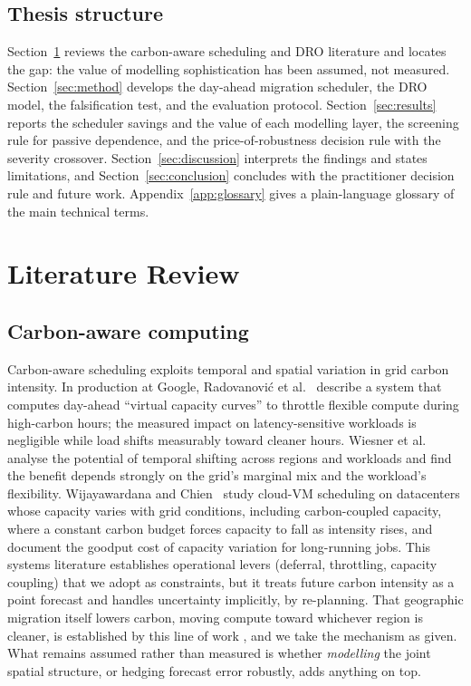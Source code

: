 \documentclass[12pt]{article}
\begin{document}
\subsection{Thesis structure}
Section~\ref{sec:lit} reviews the carbon-aware scheduling and DRO literature and
locates the gap: the value of modelling sophistication has been assumed, not
measured. Section~\ref{sec:method} develops the day-ahead migration scheduler, the
DRO model, the falsification test, and the evaluation protocol.
Section~\ref{sec:results} reports the scheduler savings and the value of each
modelling layer, the screening rule for passive dependence, and the
price-of-robustness decision rule with the severity crossover.
Section~\ref{sec:discussion} interprets the findings and states limitations, and
Section~\ref{sec:conclusion} concludes with the practitioner decision rule and future
work. Appendix~\ref{app:glossary} gives a plain-language glossary of the main
technical terms.

\section{Literature Review}\label{sec:lit}

\subsection{Carbon-aware computing}
Carbon-aware scheduling exploits temporal and spatial variation in grid carbon
intensity. In production at Google, Radovanovi\'c et
al.~\citep{radovanovic2023} describe a system that
computes day-ahead ``virtual capacity curves'' to throttle flexible compute during
high-carbon hours; the measured impact on latency-sensitive workloads is negligible
while load shifts measurably toward cleaner hours. Wiesner et al.~\citep{wiesner2021} analyse the
potential of temporal shifting across regions and workloads and find the benefit
depends strongly on the grid's marginal mix and the workload's flexibility.
Wijayawardana and Chien~\citep{wijayawardana2025} study cloud-VM scheduling on datacenters whose capacity
varies with grid conditions, including carbon-coupled capacity, where a constant
carbon budget forces capacity to fall as intensity rises, and document the
goodput cost of capacity variation for long-running jobs. This systems literature
establishes operational levers (deferral, throttling, capacity coupling) that we
adopt as constraints, but it treats future carbon intensity as a point forecast and
handles uncertainty implicitly, by re-planning. That geographic migration itself
lowers carbon, moving compute toward whichever region is cleaner, is established by
this line of work \citep{radovanovic2023,wiesner2021}, and we take the mechanism as
given. What remains assumed rather than measured is whether \emph{modelling} the joint
spatial structure, or hedging forecast error robustly, adds anything on top.
\end{document}
